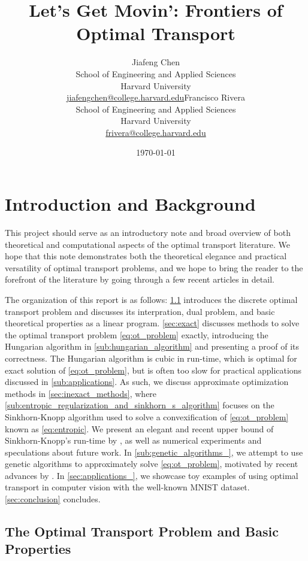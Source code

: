 \documentclass{article}
\title{Let's Get Movin': Frontiers of Optimal Transport}
\author{Jiafeng Chen\\School of Engineering and Applied Sciences\\Harvard University\\\url{jiafengchen@college.harvard.edu}\And Francisco Rivera\\School of Engineering and Applied Sciences\\Harvard University\\\url{frivera@college.harvard.edu}}
\date{\today}
\theoremstyle{definition}
\theoremstyle{remark}
\begin{document}
\maketitle
\section{Introduction and Background}

This project should serve as an introductory note and broad overview of both
 theoretical and computational aspects of the
 optimal transport literature. We hope that this note demonstrates both the
 theoretical elegance and practical versatility of optimal transport
 problems, and we hope to bring the reader to the forefront of the
 literature by going through a few recent articles in detail.

The organization of this report is as follows: \cref{sub:problem_intro}
 introduces the
 discrete optimal transport problem and discusses its interpration, dual
 problem, and basic theoretical properties as a linear program. \cref{sec:exact} discusses methods to solve the optimal transport problem \eqref{eq:ot_problem}
 exactly, introducing the Hungarian algorithm \cite{kuhn2010hungarian} in 
\cref{sub:hungarian_algorithm} and presenting a proof of its correctness. The
 Hungarian algorithm is cubic in run-time, which is optimal for exact solution
 of \eqref{eq:ot_problem}, but is often too slow for practical
 applications discussed in \cref{sub:applications}. As such, we discuss
 approximate
 optimization methods in \cref{sec:inexact_methods}, where 
\cref{sub:entropic_regularization_and_sinkhorn_s_algorithm} focuses on the
 Sinkhorn-Knopp algorithm used to solve a convexification of 
\eqref{eq:ot_problem} known as \ref{eq:entropic}. We present an elegant and
 recent upper
 bound of Sinkhorn-Knopp's run-time by
 \cite{altschuler2017near}, as well as numerical experiments and speculations
 about future work. In \cref{sub:genetic_algorithms_}, we attempt to use genetic
 algorithms to approximately solve \eqref{eq:ot_problem}, motivated by recent advances by 
\cite{such2017deep}. In \cref{sec:applications_}, we showcase toy examples of
 using optimal transport in computer vision with the well-known MNIST dataset.
 \cref{sec:conclusion} concludes.
 
 

\subsection{The Optimal Transport Problem and Basic Properties}
\label{sub:problem_intro}
\end{document}
